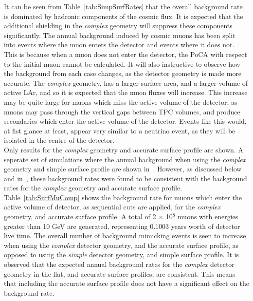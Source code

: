It can be seen from Table~\ref{tab:SimpSurfRates} that the overall background rate is dominated by hadronic components of the cosmic flux. It is expected that the additional shielding in the \emph{complex} geometry will suppress these components significantly. The annual background induced by cosmic muons has been split into events where the muon enters the detector and events where it does not. This is because when a muon does not enter the detector, the PoCA with respect to the initial muon cannot be calculated. It will also instructive to observe how the background from each case changes, as the detector geometry is made more accurate. The \emph{complex} geometry, has a larger surface area, and a larger volume of active LAr, and so it is expected that the muon fluxes will increase. This increase may be quite large for muons which miss the active volume of the detector, as muons may pass through the vertical gaps between TPC volumes, and produce secondaries which enter the active volume of the detector. Events like this would, at fist glance at least, appear very similar to a neutrino event, as they will be isolated in the centre of the detector. \\

Only results for the \emph{complex} geometry and accurate surface profile are shown. A seperate set of simulations where the annual background when using the \emph{complex} geometry and simple surface profile are shown in~\citep{MartinsThesis}. However, as discussed below and in~\citep{MartinsThesis}, these background rates were found to be consistent with the background rates for the \emph{complex} geometry and accurate surface profile. \\

Table~\ref{tab:SurfMuComp} shows the background rate for muons which enter the active volume of detector, as sequential cuts are applied, for the \emph{complex} geometry, and accurate surface profile. A total of 2 $\times$ 10$^8$ muons with energies greater than 10 GeV are generated, representing 0.1003 years worth of detector live time. The overall number of background mimicking events is seen to increase when using the \emph{complex} detector geometry, and the accurate surface profile, as opposed to using the \emph{simple} detector geometry, and simple surface profile. It is observed that the expected annual background rates for the \emph{complex} detector geometry in the flat, and accurate surface profiles, are consistent. This means that including the accurate surface profile does not have a significant effect on the background rate. \\

